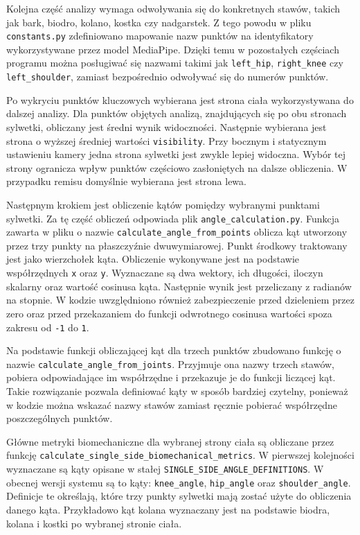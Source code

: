 Kolejna część analizy wymaga odwoływania się do konkretnych stawów, takich jak bark, biodro, kolano, kostka czy nadgarstek. Z tego powodu w pliku \texttt{constants.py} zdefiniowano mapowanie nazw punktów na identyfikatory wykorzystywane przez model MediaPipe. Dzięki temu w pozostałych częściach programu można posługiwać się nazwami takimi jak \texttt{left\_hip}, \texttt{right\_knee} czy \texttt{left\_shoulder}, zamiast bezpośrednio odwoływać się do numerów punktów.

Po wykryciu punktów kluczowych wybierana jest strona ciała wykorzystywana do dalszej analizy. Dla punktów objętych analizą, znajdujących się po obu stronach sylwetki, obliczany jest średni wynik widoczności. Następnie wybierana jest strona o wyższej średniej wartości \texttt{visibility}. Przy bocznym i statycznym ustawieniu kamery jedna strona sylwetki jest zwykle lepiej widoczna. Wybór tej strony ogranicza wpływ punktów częściowo zasłoniętych na dalsze obliczenia. W przypadku remisu domyślnie wybierana jest strona lewa.

Następnym krokiem jest obliczenie kątów pomiędzy wybranymi punktami sylwetki. Za tę część obliczeń odpowiada plik \texttt{angle\_calculation.py}. Funkcja zawarta w pliku o nazwie \texttt{calculate\_angle\_from\_points} oblicza kąt utworzony przez trzy punkty na płaszczyźnie dwuwymiarowej. Punkt środkowy traktowany jest jako wierzchołek kąta. Obliczenie wykonywane jest na podstawie współrzędnych \texttt{x} oraz \texttt{y}. Wyznaczane są dwa wektory, ich długości, iloczyn skalarny oraz wartość cosinusa kąta. Następnie wynik jest przeliczany z radianów na stopnie. W kodzie uwzględniono również zabezpieczenie przed dzieleniem przez zero oraz przed przekazaniem do funkcji odwrotnego cosinusa wartości spoza zakresu od \texttt{-1} do \texttt{1}.

Na podstawie funkcji obliczającej kąt dla trzech punktów zbudowano funkcję o nazwie \texttt{calculate\_angle\_from\_joints}. Przyjmuje ona nazwy trzech stawów, pobiera odpowiadające im współrzędne i przekazuje je do funkcji liczącej kąt. Takie rozwiązanie pozwala definiować kąty w sposób bardziej czytelny, ponieważ w kodzie można wskazać nazwy stawów zamiast ręcznie pobierać współrzędne poszczególnych punktów.

Główne metryki biomechaniczne dla wybranej strony ciała są obliczane przez funkcję \texttt{calculate\_single\_side\_biomechanical\_metrics}. W pierwszej kolejności wyznaczane są kąty opisane w stałej \texttt{SINGLE\_SIDE\_ANGLE\_DEFINITIONS}. W obecnej wersji systemu są to kąty: \texttt{knee\_angle}, \texttt{hip\_angle} oraz \texttt{shoulder\_angle}. Definicje te określają, które trzy punkty sylwetki mają zostać użyte do obliczenia danego kąta. Przykładowo kąt kolana wyznaczany jest na podstawie biodra, kolana i kostki po wybranej stronie ciała.


